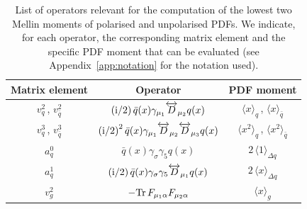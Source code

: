 \begin{table}[!t]
\renewcommand{\arraystretch}{1.6} 
\centering
\begin{tabular}{@{}ccc@{}}
\toprule 
Matrix element & Operator & PDF moment \\ 
\midrule
$v_q^2$\,, $v_{\bar{q}}^2$  & 
$\displaystyle \left({\rm i}/2\right) \bar{q}(x)\gamma_{\mu_1} \overleftrightarrow{D}_{\mu_2} q(x)$ & 
$\langle x \rangle_q$\,, $\langle x \rangle_{\bar{q}}$   \\
$v_q^3$\,, $v_{\bar{q}}^3$  & 
$\displaystyle \left({\rm i}/2\right)^2 \bar{q}(x)\gamma_{\mu_1} \overleftrightarrow{D}_{\mu_2} \overleftrightarrow{D}_{\mu_3} q(x)$ & 
$\langle x^2 \rangle_q$\,, $\langle x^2 \rangle_{\bar{q}}$ \\
$a_q^0$ & 
$\displaystyle \bar{q}(x)\gamma_{\sigma} \gamma_5 q(x)$ 
& $2\, \langle 1 \rangle_{\Delta q}$ \\
$a_q^1$ 
& $\displaystyle \left({\rm i}/2\right) \bar{q}(x)\gamma_{\sigma} \gamma_5 \overleftrightarrow{D}_{\mu_1} q(x)$ 
& $2\, \langle x \rangle_{\Delta q}$ \\
$v_g^2$ 
& $\displaystyle - {\rm Tr}\, F_{\mu_1\alpha}F_{\mu_2\alpha}$ & $\langle x \rangle_g$ \\
\bottomrule
\end{tabular}
\caption{\label{Tab:twist2}
\small List of operators relevant for
the computation of the lowest two Mellin moments of polarised and unpolarised 
PDFs.
%
We indicate, for each operator, the corresponding matrix element and
the specific PDF moment that can be evaluated (see Appendix~\ref{app:notation} 
for the notation used).}
\end{table}


